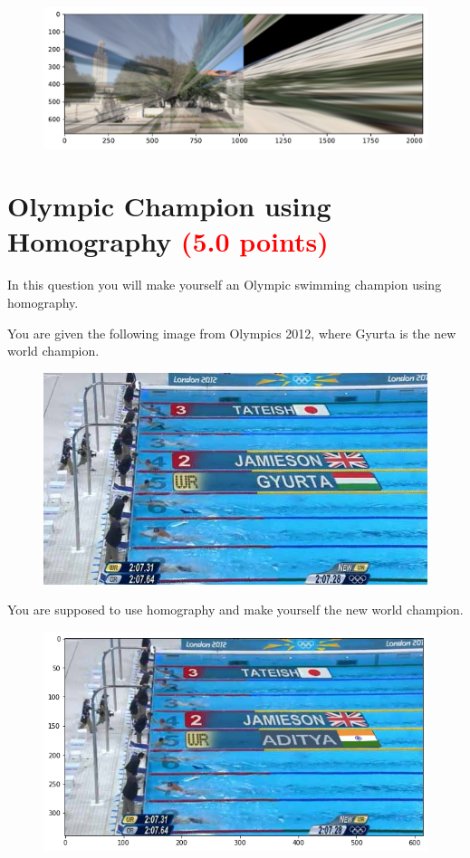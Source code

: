 \documentclass[answers]{exam}
\newcommand{\mypoints}[1]{\textcolor{red}{(#1 points)}}
\begin{document}
\begin{solution}
    \begin{figure}[H]
        \centering
        \includegraphics[width=\linewidth]{Data/Solutions/question_3_13.pdf}
    \end{figure}
\end{solution}

\newpage
\section{Olympic Champion using Homography \mypoints{5.0}}

In this question you will make yourself an Olympic swimming champion using homography.

You are given the following image from Olympics 2012, where Gyurta is the new world champion.

\begin{figure}[H]
    \centering
    \includegraphics[width=0.9\linewidth]{Images/pool-vfx.jpg}
\end{figure}

You are supposed to use homography and make yourself the new world champion.

\begin{figure}[H]
    \centering
    \includegraphics[width=\linewidth]{Images/question_4.png}
\end{figure}
\end{document}
